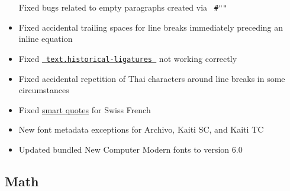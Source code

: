 \begin{itemize}
  Fixed bugs related to empty paragraphs created via \texttt{\ \#""\ }
\item
  Fixed accidental trailing spaces for line breaks immediately preceding
  an inline equation
\item
  Fixed
  \href{/docs/reference/text/text/\#parameters-historical-ligatures}{\texttt{\ text.historical-ligatures\ }}
  not working correctly
\item
  Fixed accidental repetition of Thai characters around line breaks in
  some circumstances
\item
  Fixed \href{/docs/reference/text/smartquote/}{smart quotes} for Swiss
  French
\item
  New font metadata exceptions for Archivo, Kaiti SC, and Kaiti TC
\item
  Updated bundled New Computer Modern fonts to version 6.0
\end{itemize}

\subsection{Math}\label{math}

